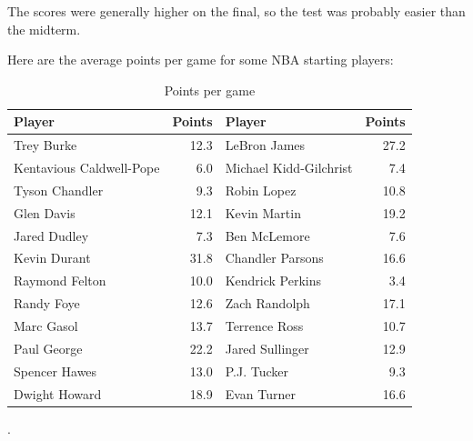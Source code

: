 \documentclass[letterpaper, landscape]{exam}
\begin{document}
\begin{questions}
\begin{parts}
          \begin{solution}
            The scores were generally higher on the final, so the test was
            probably easier than the midterm.
          \end{solution}

      \end{parts}

    \question
      \label{q:point.histogram}
      Here are the average points per game for some NBA starting players:

      \begin{table}[ht]
        \centering
        \begin{tabular}{lr|lr}
          \toprule
          Player                   & Points & Player                 & Points\\
          \midrule
          Trey Burke               & 12.3   & LeBron James           & 27.2 \\
          Kentavious Caldwell-Pope & 6.0    & Michael Kidd-Gilchrist & 7.4 \\
          Tyson Chandler           & 9.3    & Robin Lopez            & 10.8 \\
          Glen Davis               & 12.1   & Kevin Martin           & 19.2 \\
          Jared Dudley             & 7.3    & Ben McLemore           & 7.6 \\
          Kevin Durant             & 31.8   & Chandler Parsons       & 16.6 \\
          Raymond Felton           & 10.0   & Kendrick Perkins       & 3.4 \\
          Randy Foye               & 12.6   & Zach Randolph          & 17.1 \\
          Marc Gasol               & 13.7   & Terrence Ross          & 10.7 \\
          Paul George              & 22.2   & Jared Sullinger        & 12.9 \\
          Spencer Hawes            & 13.0   & P.J. Tucker            & 9.3 \\
          Dwight Howard            & 18.9   & Evan Turner            & 16.6 \\
          \bottomrule
        \end{tabular}
        \caption{Points per game}.
      \end{table}

      \begin{parts}

\end{parts}
\end{questions}
\end{document}
